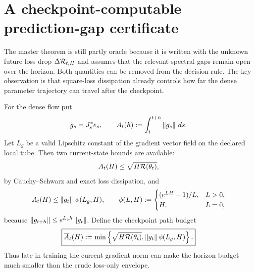 \section{A checkpoint-computable prediction-gap certificate}
The master theorem is still partly oracle because it is written with the unknown future loss drop $\Delta\mathcal R_{t,H}$ and assumes that the relevant spectral gaps remain open over the horizon. Both quantities can be removed from the decision rule. The key observation is that square-loss dissipation already controls how far the dense parameter trajectory can travel after the checkpoint.

For the dense flow put
\[
g_s=J_s^\ast e_s,
\qquad
A_t(h):=\int_t^{t+h}\left\lVert g_s\right\rVert\,ds.
\]
Let $L_g$ be a valid Lipschitz constant of the gradient vector field on the declared local tube. Then two current-state bounds are available:
\[
A_t(H)
\le \sqrt{H\mathcal R(\theta_t)},
\]
by Cauchy--Schwarz and exact loss dissipation, and
\[
A_t(H)
\le \left\lVert g_t\right\rVert\,\phi(L_g,H),
\qquad
\phi(L,H):=
\begin{cases}
(e^{LH}-1)/L,&L>0,\\
H,&L=0,
\end{cases}
\]
because $\left\lVert g_{t+h}\right\rVert\le e^{L_gh}\left\lVert g_t\right\rVert$. Define the checkpoint path budget
\[
\boxed{
\overline A_t(H)
:=
\min\left\{
\sqrt{H\mathcal R(\theta_t)},
\left\lVert g_t\right\rVert\phi(L_g,H)
\right\}.}
\]
Thus late in training the current gradient norm can make the horizon budget much smaller than the crude loss-only envelope.

